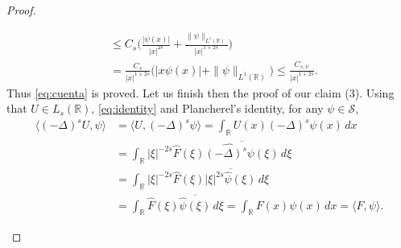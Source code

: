 \documentclass[a4paper,11pt,reqno]{amsart}
\newcommand{\R}{\mathbb{R}}
\theoremstyle{definition}
\numberwithin{equation}{section}
\begin{document}
\begin{proof}
\begin{enumerate}[$(1)$]
\begin{align*}
&\leq C_s\bigg(\frac{|\psi(x)|}{|x|^{2s}}+\frac{\|\psi\|_{L^1(\R)}}{|x|^{1+2s}}\bigg) \\
&= \frac{C_s}{|x|^{1+2s}}\big(|x\psi(x)|+\|\psi\|_{L^1(\R)}\big)\leq \frac{C_{s,\psi}}{|x|^{1+2s}}.
\end{align*}
Thus \eqref{eq:cuenta} is proved.
Let us finish then the proof of our claim (3). Using that $U\in L_s(\R)$, \eqref{eq:identity} and Plancherel's identity,
for any $\psi\in\mathcal{S}$,
\begin{equation}
\label{eq:distributions}
\begin{aligned}
	\langle (-\Delta)^sU,\psi\rangle &= \langle U,(-\Delta)^s\psi\rangle=\int_{\R}U(x)(-\Delta)^s\psi(x)\,dx \\
	&=\int_\R|\xi|^{-2s}\widehat{F}(\xi)\overline{\widehat{(-\Delta)^s\psi}(\xi)}\,d\xi \\
	&= \int_\R|\xi|^{-2s}\widehat{F}(\xi)\overline{|\xi|^{2s}\widehat{\psi}(\xi)}\,d\xi \\
	&=\int_\R\widehat{F}(\xi)\overline{\widehat{\psi}(\xi)}\,d\xi= \int_{\R}F(x)\psi(x)\,dx=\langle F,\psi\rangle.
\end{aligned}
\end{equation}


\end{enumerate}
\end{proof}
\end{document}

